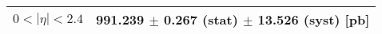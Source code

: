 \begin{tabular}{lc}
\hline
$0 < |\eta| <2.4$              & 991.239 $\pm$ 0.267 (stat) $\pm$ 13.526 (syst) [pb]  \\
\hline
\end{tabular}
